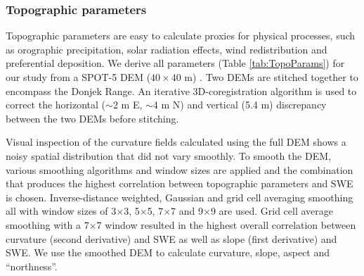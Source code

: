 \documentclass[twocolumn, letterpaper]{igs}
\begin{document}
\subsubsection{Topographic parameters}

Topographic parameters are easy to calculate proxies for physical processes, such as orographic precipitation, solar radiation effects, wind redistribution and preferential deposition. We derive all parameters (Table \ref{tab:TopoParams}) for our study from a SPOT-5 DEM ($40\times40$ m) \citep{Korona2009}. Two DEMs are stitched together to encompass the Donjek Range. An iterative 3D-coregistration algorithm \citep{Berthier2007} is used to correct the horizontal ($\sim$2 m E, $\sim$4 m N) and vertical (5.4 m) discrepancy between the two DEMs before stitching. 

Visual inspection of the curvature fields calculated using the full DEM shows a noisy spatial distribution that did not vary smoothly. To smooth the DEM, various smoothing algorithms and window sizes are applied and the combination that produces the highest correlation between topographic parameters and SWE is chosen. Inverse-distance weighted, Gaussian and grid cell averaging smoothing all with window sizes of 3$\times$3, 5$\times$5, 7$\times$7 and 9$\times$9 are used. Grid cell average smoothing with a 7$\times$7 window resulted in the highest overall correlation between curvature (second derivative) and SWE as well as slope (first derivative) and SWE. We use the smoothed DEM to calculate curvature, slope, aspect and ``northness''.
\end{document}
